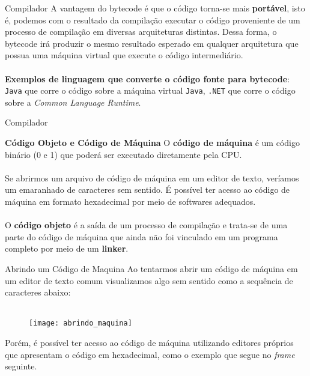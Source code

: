 \documentclass{beamer}
\begin{document}
\begin{frame}{Compilador}
A vantagem do bytecode é que o código torna-se mais \textbf{portável}, isto é, podemos com o resultado da compilação executar o código proveniente de um processo de compilação em diversas arquiteturas distintas. Dessa forma, o bytecode irá produzir o mesmo resultado esperado em qualquer arquitetura que possua uma máquina virtual que execute o código intermediário.\\~\\

\textbf{Exemplos de linguagem que converte o código fonte para bytecode}: \texttt{Java} que corre o código sobre a máquina virtual \texttt{Java}, \texttt{.NET} que corre o código sobre a \textit{Common Language Runtime}. 
\end{frame}

\begin{frame}{Compilador}
\begin{block}{\textbf{Código Objeto e Código de Máquina}}
	O \textbf{código de máquina} é um código binário (0 e 1) que poderá ser executado diretamente pela CPU.\\~\\
	
	Se abrirmos um arquivo de código de máquina em um editor de texto, veríamos um emaranhado de caracteres sem sentido. É possível ter acesso ao código de máquina em formato hexadecimal por meio de softwares adequados.\\~\\
	
	O \textbf{código objeto} é a saída de um processo de compilação e trata-se de uma parte do código de máquina que ainda não foi vinculado em um programa completo por meio de um \textbf{linker}.
\end{block}
\end{frame}

\begin{frame}{Abrindo um Código de Maquina}
Ao tentarmos abrir um código de máquina em um editor de texto comum visualizamos algo sem sentido como a sequência de caracteres abaixo:\\~\\
\pause \begin{figure}
\centering
\texttt{[image: abrindo\_maquina]}
\end{figure}
Porém, é possível ter acesso ao código de máquina utilizando editores próprios que apresentam o código em hexadecimal, como o exemplo que segue no \textit{frame} seguinte.
\end{frame}
\end{document}
